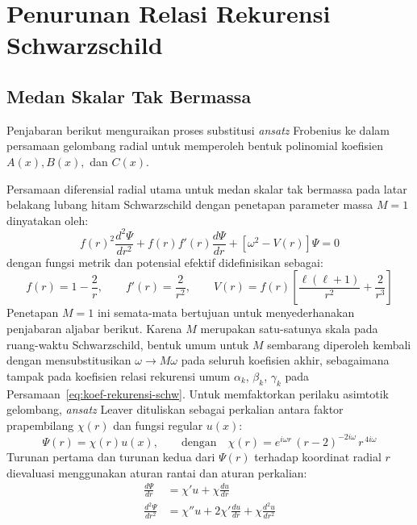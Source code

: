 \chapter{Penurunan Relasi Rekurensi Schwarzschild}
\label{app:rekuren-schw}

\section{Medan Skalar Tak Bermassa}

Penjabaran berikut menguraikan proses substitusi \textit{ansatz} Frobenius ke dalam persamaan gelombang radial untuk memperoleh bentuk polinomial koefisien $A(x), B(x),$ dan $C(x)$. 

Persamaan diferensial radial utama untuk medan skalar tak bermassa pada latar belakang lubang hitam Schwarzschild dengan penetapan parameter massa $M=1$ dinyatakan oleh:
\begin{equation}
    f(r)^2 \frac{d^2\Psi}{dr^2} + f(r)f'(r) \frac{d\Psi}{dr} + \left[ \omega^2 - V(r) \right] \Psi = 0 \label{eq:app_radial_master}
\end{equation}
dengan fungsi metrik dan potensial efektif didefinisikan sebagai:
\begin{equation}
    f(r) = 1 - \frac{2}{r}, \qquad f'(r) = \frac{2}{r^2}, \qquad V(r) = f(r) \left[ \frac{\ell(\ell+1)}{r^2} + \frac{2}{r^3} \right]
\end{equation}
Penetapan $M=1$ ini semata-mata bertujuan untuk menyederhanakan penjabaran aljabar berikut. Karena $M$ merupakan satu-satunya skala pada ruang-waktu Schwarzschild, bentuk umum untuk $M$ sembarang diperoleh kembali dengan mensubstitusikan $\omega \to M\omega$ pada seluruh koefisien akhir, sebagaimana tampak pada koefisien relasi rekurensi umum $\alpha_k$, $\beta_k$, $\gamma_k$ pada Persamaan~\eqref{eq:koef-rekurensi-schw}.
Untuk memfaktorkan perilaku asimtotik gelombang, \textit{ansatz} Leaver dituliskan sebagai perkalian antara faktor prapembilang $\chi(r)$ dan fungsi regular $u(x)$:
\begin{equation}
    \Psi(r) = \chi(r) u(x), \qquad \text{dengan} \quad \chi(r) = e^{i\omega r}\,(r - 2)^{-2i\omega}\, r^{\,4i\omega}
\end{equation}
Turunan pertama dan turunan kedua dari $\Psi(r)$ terhadap koordinat radial $r$ dievaluasi menggunakan aturan rantai dan aturan perkalian:
\begin{align}
    \frac{d\Psi}{dr} &= \chi' u + \chi \frac{du}{dr} \label{eq:app_turunan_1} \\
    \frac{d^2\Psi}{dr^2} &= \chi'' u + 2\chi' \frac{du}{dr} + \chi \frac{d^2u}{dr^2} \label{eq:app_turunan_2}
\end{align}
